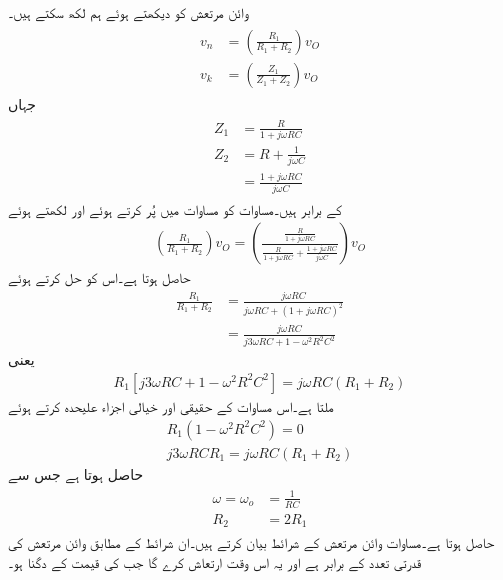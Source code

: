 وائن مرتعش کو دیکھتے ہوئے ہم لکھ سکتے ہیں۔
\begin{gather}
\begin{aligned}\label{مساوات_وائن_مرتعش_برقی_دباو}
v_n&=\left(\frac{R_1}{R_1+R_2}\right) v_O\\
v_k&=\left(\frac{Z_1}{Z_1+Z_2}\right) v_O
\end{aligned}
\end{gather} 
جہاں
\begin{gather}
\begin{aligned}\label{مساوات_وائن_مرتعش_مقاومت}
Z_1&=\frac{R}{1+j \omega R C}\\
Z_2&=R+\frac{1}{j \omega C}\\
&=\frac{1+j \omega R C}{j \omega C}
\end{aligned}
\end{gather}
کے برابر ہیں۔مساوات  کو مساوات  میں پُر کرتے ہوئے اور  لکھتے ہوئے
\begin{align*}
\left(\frac{R_1}{R_1+R_2}\right) v_O=\left(\frac{\frac{R}{1+j \omega R C}}{\frac{R}{1+j \omega R C}+\frac{1+j \omega R C}{j \omega C}}\right) v_O
\end{align*}
حاصل ہوتا ہے۔اس کو حل کرتے ہوئے
\begin{align*}
\frac{R_1}{R_1+R_2}&=\frac{j \omega R C}{j \omega R C +\left(1+j \omega R C \right)^2}\\
&=\frac{j \omega R C}{j 3 \omega R C +1-\omega^2 R^2 C^2}
\end{align*}
یعنی
\begin{align}
R_1 \left[j 3 \omega R C +1-\omega^2 R^2 C^2 \right]=j \omega R C\left(R_1+R_2 \right)
\end{align}
ملتا ہے۔اس مساوات کے حقیقی اور خیالی اجزاء علیحدہ کرتے ہوئے
\begin{align*}
R_1\left(1-\omega^2 R^2 C^2 \right)=0\\
j 3 \omega R C R_1=j\omega R C \left(R_1+R_2 \right)
\end{align*}
حاصل ہوتا ہے جس سے
\begin{gather}
\begin{aligned}\label{مساوات_وائن_مرتعش_تخلیقی_مساوات}
\omega=\omega_o &=\frac{1}{R C}\\
R_2&=2R_1
\end{aligned}
\end{gather} 
حاصل ہوتا ہے۔مساوات  وائن مرتعش کے شرائط بیان کرتے ہیں۔ان شرائط کے مطابق وائن مرتعش کی قدرتی تعدد  کے برابر ہے اور یہ اس وقت ارتعاش کرے گا جب  کی قیمت  کے دگنا ہو۔


